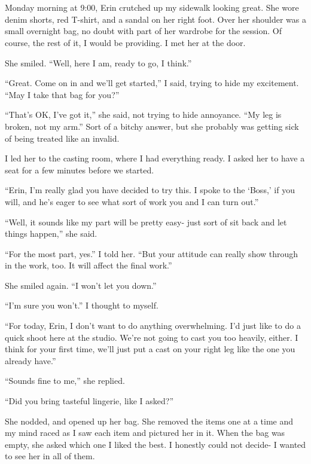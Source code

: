\chapter{}
Monday morning at 9:00, Erin crutched up my sidewalk looking great. She wore denim shorts,
red T-shirt, and a sandal on her right foot. Over her shoulder was a small overnight bag, no
doubt with part of her wardrobe for the session. Of course, the rest of it, I would be
providing. I met her at the door.

She smiled. ``Well, here I am, ready to go, I think.''

``Great. Come on in and we'll get started,'' I said, trying to hide my excitement. ``May I
take that bag for you?''

``That's OK, I've got it,'' she said, not trying to hide annoyance. ``My leg is broken, not
my arm.'' Sort of a bitchy answer, but she probably was getting sick of being treated like an
invalid.

I led her to the casting room, where I had everything ready. I asked her to have a seat for
a few minutes before we started.

``Erin, I'm really glad you have decided to try this. I spoke to the ‘Boss,' if you will,
and he's eager to see what sort of work you and I can turn out.''

``Well, it sounds like my part will be pretty easy- just sort of sit back and let things
happen,'' she said.

``For the most part, yes.'' I told her. ``But your attitude can really show through in the
work, too. It will affect the final work.''

She smiled again. ``I won't let you down.''

``I'm sure you won't.'' I thought to myself.

``For today, Erin, I don't want to do anything overwhelming. I'd just like to do a quick
shoot here at the studio. We're not going to cast you too heavily, either. I think for your
first time, we'll just put a cast on your right leg like the one you already have.''

``Sounds fine to me,'' she replied.

``Did you bring tasteful lingerie, like I asked?''

She nodded, and opened up her bag. She removed the items one at a time and my mind raced as
I saw each item and pictured her in it. When the bag was empty, she asked which one I liked the
best. I honestly could not decide- I wanted to see her in all of them.

